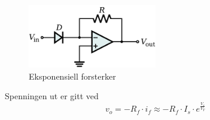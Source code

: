 \begin{figure}[H]
  \caption{Eksponensiell forsterker}
  \centering
  \includegraphics[width=0.5\textwidth]{./img/expamp}
\end{figure}

Spenningen ut er gitt ved
$$v_o = -R_f \cdot i_f \approx -R_f \cdot I_s \cdot e^{\frac{V_s}{V_T}}$$
